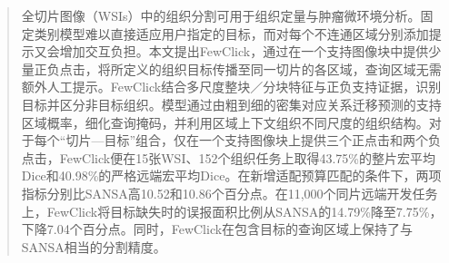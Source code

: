 \begin{abstract}
全切片图像（WSIs）中的组织分割可用于组织定量与肿瘤微环境分析。固定类别模型难以直接适应用户指定的目标，而对每个不连通区域分别添加提示又会增加交互负担。本文提出FewClick，通过在一个支持图像块中提供少量正负点击，将所定义的组织目标传播至同一切片的各区域，查询区域无需额外人工提示。FewClick结合多尺度整块／分块特征与正负支持证据，识别目标并区分非目标组织。模型通过由粗到细的密集对应关系迁移预测的支持区域概率，细化查询掩码，并利用区域上下文组织不同尺度的组织结构。对于每个“切片—目标”组合，仅在一个支持图像块上提供三个正点击和两个负点击，FewClick便在15张WSI、152个组织任务上取得43.75\%的整片宏平均Dice和40.98\%的严格远端宏平均Dice。在新增适配预算匹配的条件下，两项指标分别比SANSA高10.52和10.86个百分点。在11,000个同片远端开发任务上，FewClick将目标缺失时的误报面积比例从SANSA的14.79\%降至7.75\%，下降7.04个百分点。同时，FewClick在包含目标的查询区域上保持了与SANSA相当的分割精度。
\end{abstract}
